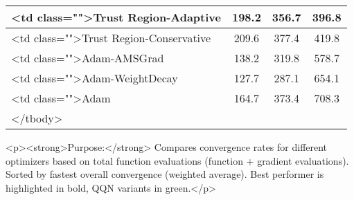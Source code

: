 \documentclass{article}
\begin{document}
\begin{tabular}{|l|c|c|c|}
                <td class="">Trust Region-Adaptive & 
                198.2 & 
                356.7 & 
                396.8 & 
             \\
\hline
            
                <td class="">Trust Region-Conservative & 
                209.6 & 
                377.4 & 
                419.8 & 
             \\
\hline
            
                <td class="">Adam-AMSGrad & 
                138.2 & 
                319.8 & 
                578.7 & 
             \\
\hline
            
                <td class="">Adam-WeightDecay & 
                127.7 & 
                287.1 & 
                654.1 & 
             \\
\hline
            
                <td class="">Adam & 
                164.7 & 
                373.4 & 
                708.3 & 
             \\
\hline
        </tbody>
    \end{tabular}
    <p><strong>Purpose:</strong> Compares convergence rates for different optimizers based on total function evaluations (function + gradient evaluations). Sorted by fastest overall convergence (weighted average). Best performer is highlighted in bold, QQN variants in green.</p>
\end{document}
